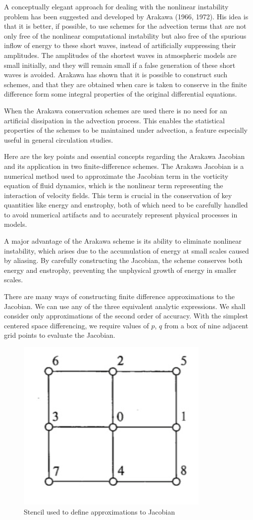 A conceptually elegant approach for dealing with the nonlinear instability problem has been suggested and developed by Arakawa (1966, 1972). His idea is that it is better, if possible, to use schemes for the advection terms that are not only free of the nonlinear computational instability but also free of the spurious inflow of energy to these short waves, instead of artificially suppressing their amplitudes. The amplitudes of the shortest waves in atmospheric models are small initially, and they will remain small if a false generation of these short waves is avoided. Arakawa has shown that it is possible to construct such schemes, and that they are obtained when care is taken to conserve in the finite difference form some integral properties of the original differential equations.

When the Arakawa conservation schemes are used there is no need for an artificial dissipation in the advection process. This enables the statistical properties of the schemes to be maintained under advection, a feature especially useful in general circulation studies.
 
Here are the key points and essential concepts regarding the Arakawa Jacobian and its application in two finite-difference schemes. The Arakawa Jacobian is a numerical method used to approximate the Jacobian term in the vorticity equation of fluid dynamics, which is the nonlinear term representing the interaction of velocity fields. This term is crucial in the conservation of key quantities like energy and enstrophy, both of which need to be carefully handled to avoid numerical artifacts and to accurately represent physical processes in models.



A major advantage of the Arakawa scheme is its ability to eliminate nonlinear instability, which arises due to the accumulation of energy at small scales caused by aliasing. By carefully constructing the Jacobian, the scheme conserves both energy and enstrophy, preventing the unphysical growth of energy in smaller scales.

There are many ways of constructing finite difference approximations to the Jacobian. We can use any of the three equivalent analytic expressions. We shall consider only approximations of the second order of accuracy. With the simplest centered space differencing, we require values of $p$, $q$ from a box of nine adjacent grid points to evaluate the Jacobian.
\begin{figure}[h]
    \centering
    \includegraphics[width=0.25\linewidth]{uploads/Screenshot 2024-11-13 174915.png}
    \caption{Stencil used to define approximations to Jacobian}
    \label{fig:4.7.2}
\end{figure}

